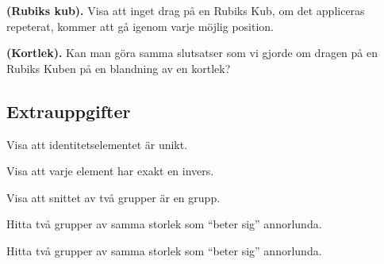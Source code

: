 \documentclass[11pt,fleqn]{book} %
\begin{document}
\begin{problem} \textbf{(Rubiks kub).}
  Visa att inget drag på en Rubiks Kub, om det appliceras repeterat, kommer att gå igenom varje möjlig position.
\end{problem}

\begin{problem} \textbf{(Kortlek).}
  Kan man göra samma slutsatser som vi gjorde om dragen på en Rubiks Kuben på en blandning av en kortlek?
\end{problem}

\subsection*{Extrauppgifter}
\begin{problem} %
  Visa att identitetselementet är unikt.
\end{problem}

\begin{problem}
  Visa att varje element har exakt en invers.
\end{problem}

\begin{problem}
  Visa att snittet av två grupper är en grupp.
\end{problem}

\begin{problem}
  Hitta två grupper av samma storlek som ``beter sig'' annorlunda.
\end{problem}

\begin{problem}
  Hitta två grupper av samma storlek som ``beter sig'' annorlunda.
\end{problem}


\end{document}
